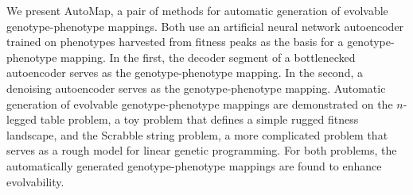 We present AutoMap, a pair of methods for automatic generation of evolvable genotype-phenotype mappings.
Both use an artificial neural network autoencoder trained on phenotypes harvested from fitness peaks as the basis for a genotype-phenotype mapping.
In the first, the decoder segment of a bottlenecked autoencoder serves as the genotype-phenotype mapping.
In the second, a denoising autoencoder serves as the genotype-phenotype mapping.
Automatic generation of evolvable genotype-phenotype mappings are demonstrated on the $n$-legged table problem, a toy problem that defines a simple rugged fitness landscape, and the Scrabble string problem, a more complicated problem that serves as a rough model for linear genetic programming.
For both problems, the automatically generated genotype-phenotype mappings are found to enhance evolvability.
